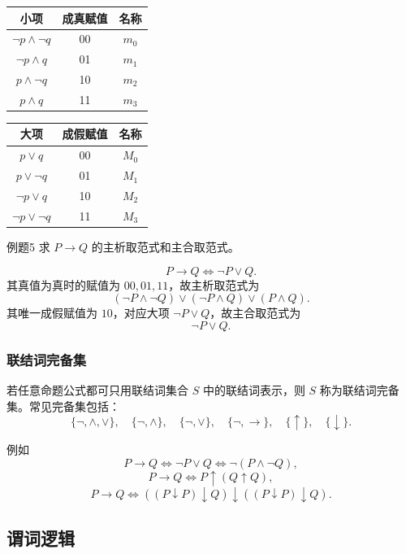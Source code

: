 \begin{center}
	\begin{tabular}{ccc}
		\toprule
		小项 & 成真赋值 & 名称\\
		\midrule
		\(\neg p\land\neg q\)&00&\(m_0\)\\
		\(\neg p\land q\)&01&\(m_1\)\\
		\(p\land\neg q\)&10&\(m_2\)\\
		\(p\land q\)&11&\(m_3\)\\
		\bottomrule
	\end{tabular}
	\qquad
	\begin{tabular}{ccc}
		\toprule
		大项 & 成假赋值 & 名称\\
		\midrule
		\(p\lor q\)&00&\(M_0\)\\
		\(p\lor\neg q\)&01&\(M_1\)\\
		\(\neg p\lor q\)&10&\(M_2\)\\
		\(\neg p\lor\neg q\)&11&\(M_3\)\\
		\bottomrule
	\end{tabular}
\end{center}

\begin{question}{例题5}
	求 \(P\to Q\) 的主析取范式和主合取范式。
	
	\begin{solution}
	\[
	P\to Q\Leftrightarrow\neg P\lor Q.
	\]
	其真值为真时的赋值为 \(00,01,11\)，故主析取范式为
	\[
	(\neg P\land\neg Q)\lor(\neg P\land Q)\lor(P\land Q).
	\]
	其唯一成假赋值为 \(10\)，对应大项 \(\neg P\lor Q\)，故主合取范式为
	\[
	\neg P\lor Q.
	\]
	\end{solution}
\end{question}

\subsubsection{联结词完备集}

若任意命题公式都可只用联结词集合 \(S\) 中的联结词表示，则 \(S\) 称为联结词完备集。常见完备集包括：
\[
\{\neg,\land,\lor\},\quad
\{\neg,\land\},\quad
\{\neg,\lor\},\quad
\{\neg,\to\},\quad
\{\uparrow\},\quad
\{\downarrow\}.
\]

例如
\[
P\to Q\Leftrightarrow \neg P\lor Q\Leftrightarrow \neg(P\land\neg Q),
\]
\[
P\to Q\Leftrightarrow P\uparrow(Q\uparrow Q),
\]
\[
P\to Q\Leftrightarrow ((P\downarrow P)\downarrow Q)\downarrow((P\downarrow P)\downarrow Q).
\]

\subsection{谓词逻辑}

